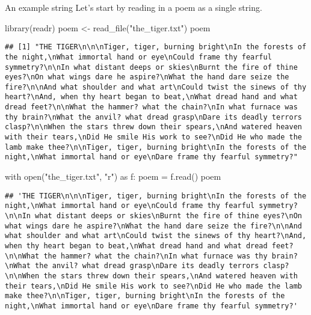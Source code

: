 \documentclass[
  10pt,
  ignorenonframetext,
  aspectratio=169]{beamer}
\newenvironment{Shaded}{\begin{snugshade}}{\end{snugshade}}
\newcommand{\BuiltInTok}[1]{\textcolor[rgb]{0.80,0.80,0.80}{#1}}
\newcommand{\ControlFlowTok}[1]{\textcolor[rgb]{0.94,0.87,0.69}{#1}}
\newcommand{\FunctionTok}[1]{\textcolor[rgb]{0.94,0.94,0.56}{#1}}
\newcommand{\ImportTok}[1]{\textcolor[rgb]{0.80,0.80,0.80}{#1}}
\newcommand{\NormalTok}[1]{\textcolor[rgb]{0.80,0.80,0.80}{#1}}
\newcommand{\OperatorTok}[1]{\textcolor[rgb]{0.94,0.94,0.82}{#1}}
\newcommand{\OtherTok}[1]{\textcolor[rgb]{0.94,0.94,0.56}{#1}}
\newcommand{\StringTok}[1]{\textcolor[rgb]{0.80,0.58,0.58}{#1}}
\begin{document}
\begin{frame}[fragile]{An example string}
\protect\hypertarget{an-example-string}{}
Let's start by reading in a poem as a single string.

\scriptsize

\begin{Shaded}
\begin{Highlighting}[]
\FunctionTok{library}\NormalTok{(readr)}
\NormalTok{poem }\OtherTok{\textless{}{-}} \FunctionTok{read\_file}\NormalTok{(}\StringTok{"the\_tiger.txt"}\NormalTok{)}
\NormalTok{poem}
\end{Highlighting}
\end{Shaded}

\begin{verbatim}
## [1] "THE TIGER\n\n\nTiger, tiger, burning bright\nIn the forests of the night,\nWhat immortal hand or eye\nCould frame thy fearful symmetry?\n\nIn what distant deeps or skies\nBurnt the fire of thine eyes?\nOn what wings dare he aspire?\nWhat the hand dare seize the fire?\n\nAnd what shoulder and what art\nCould twist the sinews of thy heart?\nAnd, when thy heart began to beat,\nWhat dread hand and what dread feet?\n\nWhat the hammer? what the chain?\nIn what furnace was thy brain?\nWhat the anvil? what dread grasp\nDare its deadly terrors clasp?\n\nWhen the stars threw down their spears,\nAnd watered heaven with their tears,\nDid He smile His work to see?\nDid He who made the lamb make thee?\n\nTiger, tiger, burning bright\nIn the forests of the night,\nWhat immortal hand or eye\nDare frame thy fearful symmetry?"
\end{verbatim}

\begin{Shaded}
\begin{Highlighting}[]
\ControlFlowTok{with} \BuiltInTok{open}\NormalTok{(}\StringTok{"the\_tiger.txt"}\NormalTok{, }\StringTok{"r"}\NormalTok{) }\ImportTok{as}\NormalTok{ f:}
\NormalTok{    poem }\OperatorTok{=}\NormalTok{ f.read()}
\NormalTok{poem}
\end{Highlighting}
\end{Shaded}

\begin{verbatim}
## 'THE TIGER\n\n\nTiger, tiger, burning bright\nIn the forests of the night,\nWhat immortal hand or eye\nCould frame thy fearful symmetry?\n\nIn what distant deeps or skies\nBurnt the fire of thine eyes?\nOn what wings dare he aspire?\nWhat the hand dare seize the fire?\n\nAnd what shoulder and what art\nCould twist the sinews of thy heart?\nAnd, when thy heart began to beat,\nWhat dread hand and what dread feet?\n\nWhat the hammer? what the chain?\nIn what furnace was thy brain?\nWhat the anvil? what dread grasp\nDare its deadly terrors clasp?\n\nWhen the stars threw down their spears,\nAnd watered heaven with their tears,\nDid He smile His work to see?\nDid He who made the lamb make thee?\n\nTiger, tiger, burning bright\nIn the forests of the night,\nWhat immortal hand or eye\nDare frame thy fearful symmetry?'
\end{verbatim}
\end{frame}
\end{document}
